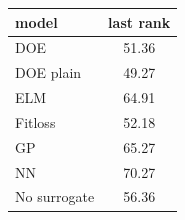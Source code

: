 \begin{tabular}{|lc|}
\hline
model & last rank\\
\hline
DOE & 51.36 \\
DOE plain & 49.27 \\
ELM & 64.91 \\
Fitloss & 52.18 \\
GP & 65.27 \\
NN & 70.27 \\
No surrogate & 56.36 \\
\hline
\end{tabular}
